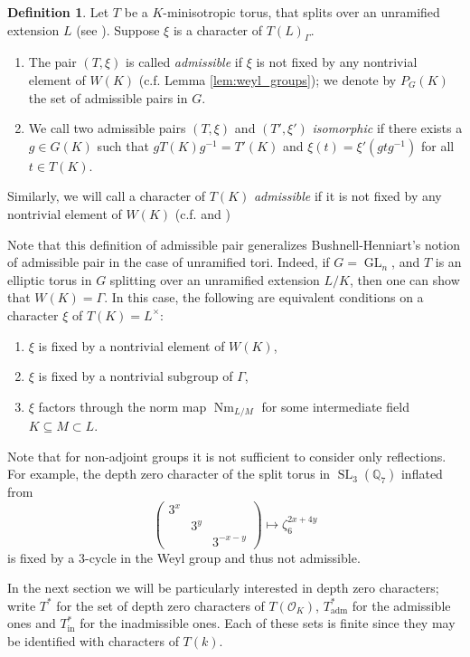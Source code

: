 \documentclass{compositio}
\theoremstyle{plain}
\theoremstyle{definition}
\newtheorem{definition}[theorem]{Definition}
\DeclareMathOperator{\Nm}{Nm}
\DeclareMathOperator{\GL}{GL}
\DeclareMathOperator{\SL}{SL}
\newcommand{\OK}{\mathcal{O}_K}
\newcommand{\QQ}{\mathbb{Q}}
\newcommand{\Lx}{L^\times}
\newcommand{\Thadm}{T^*_{\operatorname{adm}}}
\newcommand{\Thinadm}{T^*_{\operatorname{in}}}
\newcommand{\hatT}{T^*}
\begin{document}
\begin{definition} \label{def:admissible}
Let $T$ be a $K$-minisotropic torus, that splits over an unramified
extension $L$ (see \cite[\S3]{reeder:08a}).  Suppose $\xi$ is a character of $T(L)_{\Gamma}$.
\begin{enumerate}
\item The pair $(T, \xi)$ is called \emph{admissible} if $\xi$ is not fixed
by any nontrivial element of $W(K)$ (c.f. Lemma \ref{lem:weyl_groups}); we
denote by $P_G(K)$ the set of admissible pairs in $G$.
\item We call two admissible pairs $(T, \xi)$ and $(T', \xi')$ \emph{isomorphic} if there
exists a $g \in G(K)$ such that $gT(K)g^{-1} = T'(K)$ and $\xi(t) = \xi'(gtg^{-1})$
for all $t \in T(K)$.
\end{enumerate}
Similarly, we will call a character of $T(K)$ \emph{admissible} if
it is not fixed by any nontrivial element of $W(K)$
(c.f. \cite[p. 802]{reeder-debacker:09a} and \cite[\S3]{reeder:08a})
\end{definition}

Note that this definition of admissible pair generalizes
Bushnell-Henniart's notion of admissible pair \cite{bushnell-henniart:10a} in
the case of unramified tori.  Indeed,
if $G = \GL_n$, and $T$ is an elliptic torus in $G$ splitting over
an unramified extension $L/K$, then one can show that
$W(K) = \Gamma$.  In this case, the following are equivalent conditions
on a character $\xi$ of $T(K) = \Lx$:
\begin{enumerate}
\item $\xi$ is fixed by a nontrivial element of $W(K)$,
\item $\xi$ is fixed by a nontrivial subgroup of $\Gamma$,
\item $\xi$ factors through the norm map $\Nm_{L/M}$ for some intermediate field $K \subseteq M \subset L$.
\end{enumerate}

Note that for non-adjoint groups it is not sufficient to consider only reflections.
For example, the depth zero character of the split torus in $\SL_3(\QQ_7)$ inflated from
$$\begin{pmatrix} 3^x & & \\ & 3^y & \\ & & 3^{-x-y} \end{pmatrix} \mapsto \zeta_6^{2x + 4y}$$
is fixed by a 3-cycle in the Weyl group and thus not admissible.

In the next section we will be particularly interested in depth zero characters; write $\hatT$ for the set of
depth zero characters of $T(\OK)$, $\Thadm$ for the admissible
ones and $\Thinadm$ for the inadmissible ones.  Each of these
sets is finite since they may be identified with characters of $T(k)$.
\end{document}
